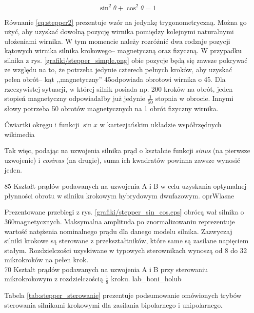 \begin{equation} \label{eq:stepper2}
	\sin^2\theta + \cos^2\theta = 1
\end{equation}

Równanie \ref{eq:stepper2} prezentuje wzór na jedynkę trygonometryczną. Można go użyć, aby uzyskać dowolną pozycję wirnika pomiędzy kolejnymi naturalnymi ułożeniami wirnika. W tym momencie należy rozróżnić dwa rodzaje pozycji kątowych wirnika silnika krokowego-- magnetyczną oraz fizyczną. W przypadku silnika z rys. \ref{grafiki/stepper_simple.png} obie pozycje będą się zawsze pokrywać ze względu na to, że potrzeba jedynie czterech pełnych kroków, aby uzyskać pełen obrót-- kąt ,,magnetyczny'' 45\degree odpowiada obrotowi wirnika o 45\degree. Dla rzeczywistej sytuacji, w której silnik posiada np. 200 kroków na obrót, jeden stopień magnetyczny odpowiadałby już jedynie $ \frac{1}{50} $ stopnia w obrocie. Innymi słowy potrzeba 50 obrotów magnetycznych na 1 obrót fizyczny wirnika.

		{Ćwiartki okręgu i funkcji $ \sin x $ w kartezjańskim układzie współrzędnych}
		{wikimedia}
		
Tak więc, podając na uzwojenia silnika prąd o kształcie funkcji {\it sinus} (na pierwsze uzwojenie) i {\it cosinus} (na drugie), suma ich kwadratów powinna zawsze wynosić jeden. 

		{85}
		{Kształt prądów podawanych na uzwojenia A i B w celu uzyskania optymalnej płynności obrotu w silniku krokowym hybrydowym dwufazowym.}
		{oprWlasne}
		
Prezentowane przebiegi z rys. \ref{grafiki/stepper_sin_cos.eps} obrócą wał silnika o 360\degree magnetycznych. Maksymalna amplituda po znormalizowaniu reprezentuje wartość natężenia nominalnego prądu dla danego modelu silnika. Zazwyczaj silniki krokowe są sterowane z przekształtników, które same są zasilane napięciem stałym. Rozdzielczości uzyskiwane w typowych sterownikach wynoszą od 8 do 32 mikrokroków na pełen krok.  \\

		{70}
		{Kształt prądów podawanych na uzwojenia A i B przy sterowaniu mikrokrokowym z rozdzielczością $ \frac{1}{8} $ kroku.}
		{lab_boni_holub}
		
Tabela \ref{tab:stepper_sterowanie} prezentuje podsumowanie omówionych trybów sterowania silnikami krokowymi dla zasilania bipolarnego i unipolarnego.

